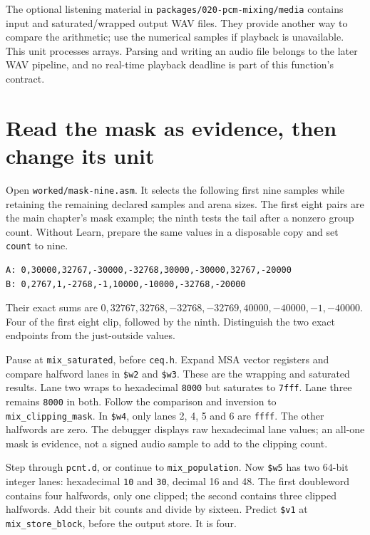The optional listening material in \texttt{packages/020-pcm-mixing/media} contains
input and saturated/wrapped output WAV files. They provide another way to compare
the arithmetic; use the numerical samples if playback is unavailable. This unit
processes arrays. Parsing and writing an audio file belongs to the later WAV
pipeline, and no real-time playback deadline is part of this function's contract.

\section{Read the mask as evidence, then change its unit}

Open \texttt{worked/mask-nine.asm}. It selects the following first nine
samples while retaining the remaining declared samples and arena sizes. The
first eight pairs are the main chapter's mask example; the ninth tests the tail
after a nonzero group count. Without Learn, prepare the same values in a
disposable copy and set \texttt{count} to nine.
\begin{verbatim}
A: 0,30000,32767,-30000,-32768,30000,-30000,32767,-20000
B: 0,2767,1,-2768,-1,10000,-10000,-32768,-20000
\end{verbatim}
Their exact sums are $0,32767,32768,-32768,-32769,40000,-40000,-1,-40000$.
Four of the first eight clip, followed by the ninth. Distinguish the two exact
endpoints from the just-outside values.

Pause at \texttt{mix\_saturated}, before \texttt{ceq.h}. Expand MSA vector
registers and compare halfword lanes in \texttt{\$w2} and \texttt{\$w3}.
These are the wrapping and saturated results. Lane two wraps to hexadecimal
\texttt{8000} but saturates to \texttt{7fff}. Lane three remains
\texttt{8000} in both. Follow the comparison and inversion to
\texttt{mix\_clipping\_mask}. In \texttt{\$w4}, only lanes 2, 4, 5 and 6
are \texttt{ffff}. The other halfwords are zero. The debugger displays raw
hexadecimal lane values; an all-one mask is evidence, not a signed audio sample
to add to the clipping count.

Step through \texttt{pcnt.d}, or continue to \texttt{mix\_population}.
Now \texttt{\$w5} has two 64-bit integer lanes: hexadecimal \texttt{10} and
\texttt{30}, decimal 16 and 48. The first doubleword contains four halfwords,
only one clipped; the second contains three clipped halfwords. Add their bit
counts and divide by sixteen. Predict \texttt{\$v1} at
\texttt{mix\_store\_block}, before the output store. It is four.

